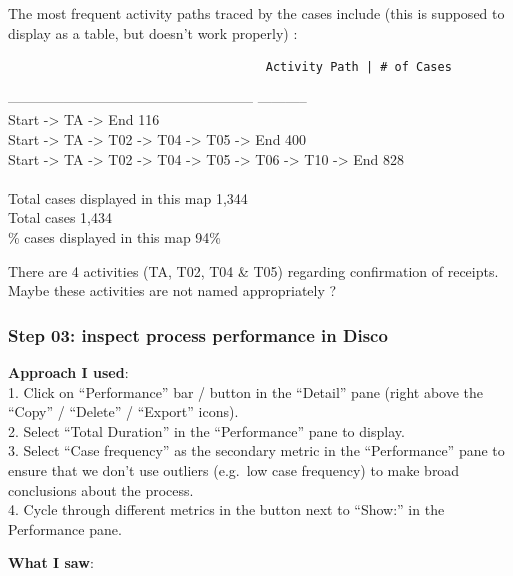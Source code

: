 \documentclass[]{article}
\begin{document}
The most frequent activity paths traced by the cases include (this is
supposed to display as a table, but doesn't work properly) :

\begin{verbatim}
                                    Activity Path | # of Cases  
\end{verbatim}

----------------------------------------------------- \textbar{}
-----------\\ Start -\textgreater{} TA -\textgreater{} End \textbar{}
116\\ Start -\textgreater{} TA -\textgreater{} T02 -\textgreater{} T04
-\textgreater{} T05 -\textgreater{} End \textbar{} 400\\Start
-\textgreater{} TA -\textgreater{} T02 -\textgreater{} T04
-\textgreater{} T05 -\textgreater{} T06 -\textgreater{} T10
-\textgreater{} End \textbar{} 828\\ \textbar{}\\ Total cases displayed
in this map \textbar{} 1,344\\ Total cases \textbar{} 1,434\\ \% cases
displayed in this map \textbar{} 94\%

There are 4 activities (TA, T02, T04 \& T05) regarding confirmation of
receipts. Maybe these activities are not named appropriately ?

\subsubsection{Step 03: inspect process performance in
Disco}\label{step-03-inspect-process-performance-in-disco}

\textbf{Approach I used}:\\1. Click on ``Performance'' bar / button in
the ``Detail'' pane (right above the ``Copy'' / ``Delete'' / ``Export''
icons).\\2. Select ``Total Duration'' in the ``Performance'' pane to
display.\\3. Select ``Case frequency'' as the secondary metric in the
``Performance'' pane to ensure that we don't use outliers (e.g.~low case
frequency) to make broad conclusions about the process.\\4. Cycle
through different metrics in the button next to ``Show:'' in the
Performance pane.

\textbf{What I saw}:
\end{document}
